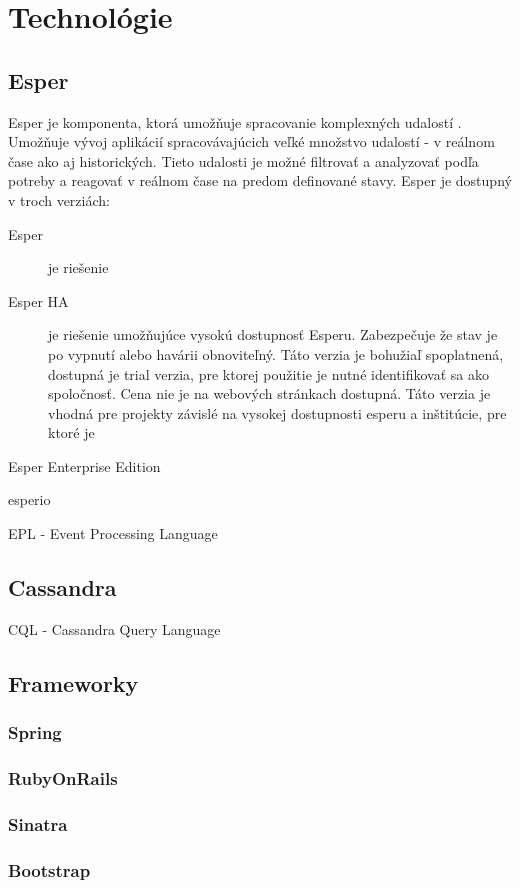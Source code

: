 \chapter{Technológie}
\section{Esper}
	Esper je komponenta, ktorá umožňuje spracovanie komplexných udalostí . Umožňuje vývoj aplikácií spracovávajúcich veľké množstvo udalostí - v reálnom čase ako aj historických. Tieto udalosti je možné filtrovať a analyzovať podľa potreby a reagovať v reálnom čase na predom definované stavy.  Esper je dostupný v troch verziách:
	\begin{description}
		\item[Esper] je riešenie
		
		\item[Esper HA] je riešenie umožňujúce vysokú dostupnosť Esperu. Zabezpečuje že stav je po vypnutí alebo havárii obnoviteľný. Táto verzia je bohužiaľ spoplatnená, dostupná je trial verzia, pre ktorej použitie je nutné identifikovať sa ako spoločnosť. Cena nie je na webových stránkach dostupná. Táto verzia je vhodná pre projekty závislé na vysokej dostupnosti esperu a inštitúcie, pre ktoré je 
		
		\item[Esper Enterprise Edition] 
	\end{description}
	
	esperio
	
	
	EPL - Event Processing Language
\section{Cassandra}
	CQL - Cassandra Query Language
\section{Frameworky}
	\subsection{Spring}
	\subsection{RubyOnRails}
	\subsection{Sinatra}
	\subsection{Bootstrap}
